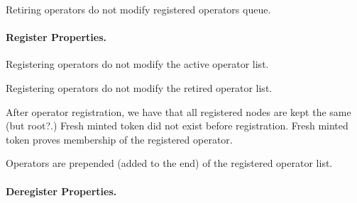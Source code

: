 \begin{theorem}
  \leanok
  \label{thm:OperatorDirectory.Properties.Actions.retired_registered}
  Retiring operators do not modify registered operators queue.
  \end{theorem}

\paragraph*{Register Properties.}

\begin{theorem}
  \leanok
  \label{thm:OperatorDirectory.Properties.Actions.register_same_active}
  Registering operators do not modify the active operator list.
  \end{theorem}
\begin{theorem}
  \leanok
  \label{thm:OperatorDirectory.Properties.Actions.register_same_retired}
  Registering operators do not modify the retired operator list.
  \end{theorem}

\begin{theorem}
  \leanok
  \label{thm:OperatorDirectory.Properties.Actions.register_register}
  After operator registration, we have that all registered nodes are kept the same (but root?.)
  Fresh minted token did not exist before registration.
  Fresh minted token proves membership of the registered operator.
  \end{theorem}

\begin{theorem}
  \leanok
  \label{thm:OperatorDirectory.Properties.Actions.register_prepend}
  Operators are prepended (added to the end) of the registered operator list.
  \end{theorem}


\paragraph*{Deregister Properties.}

